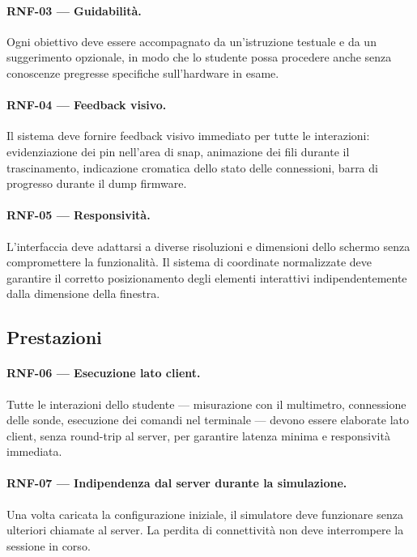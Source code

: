 \paragraph{RNF-03 --- Guidabilità.} Ogni obiettivo deve essere accompagnato da un'istruzione testuale e da un suggerimento opzionale, in modo che lo studente possa procedere anche senza conoscenze pregresse specifiche sull'hardware in esame.

\paragraph{RNF-04 --- Feedback visivo.} Il sistema deve fornire feedback visivo immediato per tutte le interazioni: evidenziazione dei pin nell'area di snap, animazione dei fili durante il trascinamento, indicazione cromatica dello stato delle connessioni, barra di progresso durante il dump firmware.

\paragraph{RNF-05 --- Responsività.} L'interfaccia deve adattarsi a diverse risoluzioni e dimensioni dello schermo senza compromettere la funzionalità. Il sistema di coordinate normalizzate deve garantire il corretto posizionamento degli elementi interattivi indipendentemente dalla dimensione della finestra.

\subsection{Prestazioni}
\label{subsec:rnf-prestazioni}

\paragraph{RNF-06 --- Esecuzione lato client.} Tutte le interazioni dello studente --- misurazione con il multimetro, connessione delle sonde, esecuzione dei comandi nel terminale --- devono essere elaborate lato client, senza round-trip al server, per garantire latenza minima e responsività immediata.

\paragraph{RNF-07 --- Indipendenza dal server durante la simulazione.} Una volta caricata la configurazione iniziale, il simulatore deve funzionare senza ulteriori chiamate al server. La perdita di connettività non deve interrompere la sessione in corso.

